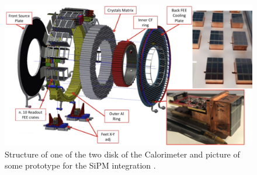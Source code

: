 \documentclass[12pt,a4paper,openright, oneside, titlepage]{book} %
\begin{document}
\begin{figure}[h!]
\centering
\includegraphics[scale=0.8]{mu2e_calorimeter_disk_2}
\caption{Structure of one of the two disk of the Calorimeter and picture of some prototype for the SiPM integration \cite{Calorimeter:2020}.}
\label{_mu2e_calorimeter_disk}
\end{figure}
\end{document}
